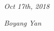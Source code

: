 \documentclass[]{friggeri-cv}
\begin{document}
\begin{flushleft}
\emph{Oct 17th, 2018}
\end{flushleft}
\begin{flushright}
\emph{Boyang Yan}
\end{flushright}

% 
\end{document}
